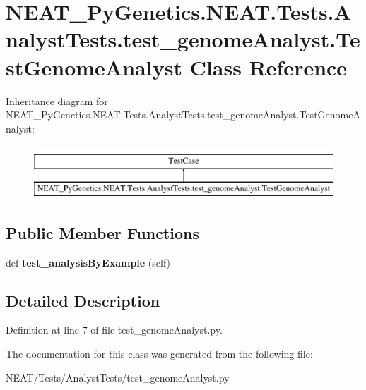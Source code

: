 \hypertarget{class_n_e_a_t___py_genetics_1_1_n_e_a_t_1_1_tests_1_1_analyst_tests_1_1test__genome_analyst_1_1_test_genome_analyst}{}\section{N\+E\+A\+T\+\_\+\+Py\+Genetics.\+N\+E\+A\+T.\+Tests.\+Analyst\+Tests.\+test\+\_\+genome\+Analyst.\+Test\+Genome\+Analyst Class Reference}
\label{class_n_e_a_t___py_genetics_1_1_n_e_a_t_1_1_tests_1_1_analyst_tests_1_1test__genome_analyst_1_1_test_genome_analyst}
Inheritance diagram for N\+E\+A\+T\+\_\+\+Py\+Genetics.\+N\+E\+A\+T.\+Tests.\+Analyst\+Tests.\+test\+\_\+genome\+Analyst.\+Test\+Genome\+Analyst\+:\begin{figure}[H]
\begin{center}
\leavevmode
\includegraphics[height=2.000000cm]{class_n_e_a_t___py_genetics_1_1_n_e_a_t_1_1_tests_1_1_analyst_tests_1_1test__genome_analyst_1_1_test_genome_analyst}
\end{center}
\end{figure}
\subsection*{Public Member Functions}
\begin{DoxyCompactItemize}
\item 
def {\bfseries test\+\_\+analysis\+By\+Example} (self)\hypertarget{class_n_e_a_t___py_genetics_1_1_n_e_a_t_1_1_tests_1_1_analyst_tests_1_1test__genome_analyst_1_1_test_genome_analyst_a53539d6400718b534692e71255228de4}{}\label{class_n_e_a_t___py_genetics_1_1_n_e_a_t_1_1_tests_1_1_analyst_tests_1_1test__genome_analyst_1_1_test_genome_analyst_a53539d6400718b534692e71255228de4}

\end{DoxyCompactItemize}


\subsection{Detailed Description}


Definition at line 7 of file test\+\_\+genome\+Analyst.\+py.



The documentation for this class was generated from the following file\+:\begin{DoxyCompactItemize}
\item 
N\+E\+A\+T/\+Tests/\+Analyst\+Tests/test\+\_\+genome\+Analyst.\+py\end{DoxyCompactItemize}
